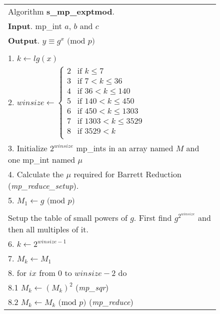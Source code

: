 \documentclass[b5paper]{book}
\begin{document}
\newpage\begin{figure}[!here]
\begin{small}
\begin{center}
\begin{tabular}{l}
\hline Algorithm \textbf{s\_mp\_exptmod}. \\
\textbf{Input}.   mp\_int $a$, $b$ and $c$ \\
\textbf{Output}.  $y \equiv g^x \mbox{ (mod }p\mbox{)}$ \\
\hline \\
1.  $k \leftarrow lg(x)$ \\
2.  $winsize \leftarrow  \left \lbrace \begin{array}{ll}
                              2 &  \mbox{if }k \le 7 \\
                              3 &  \mbox{if }7 < k \le 36 \\
                              4 &  \mbox{if }36 < k \le 140 \\
                              5 &  \mbox{if }140 < k \le 450 \\
                              6 &  \mbox{if }450 < k \le 1303 \\
                              7 &  \mbox{if }1303 < k \le 3529 \\
                              8 &  \mbox{if }3529 < k \\
                              \end{array} \right .$ \\
3.  Initialize $2^{winsize}$ mp\_ints in an array named $M$ and one mp\_int named $\mu$ \\
4.  Calculate the $\mu$ required for Barrett Reduction (\textit{mp\_reduce\_setup}). \\
5.  $M_1 \leftarrow g \mbox{ (mod }p\mbox{)}$ \\
\\
Setup the table of small powers of $g$.  First find $g^{2^{winsize}}$ and then all multiples of it. \\
6.  $k \leftarrow 2^{winsize - 1}$ \\
7.  $M_{k} \leftarrow M_1$ \\
8.  for $ix$ from 0 to $winsize - 2$ do \\
\hspace{3mm}8.1  $M_k \leftarrow \left ( M_k \right )^2$ (\textit{mp\_sqr})  \\
\hspace{3mm}8.2  $M_k \leftarrow M_k \mbox{ (mod }p\mbox{)}$ (\textit{mp\_reduce}) \\

\end{tabular}
\end{center}
\end{small}
\end{figure}
\end{document}
